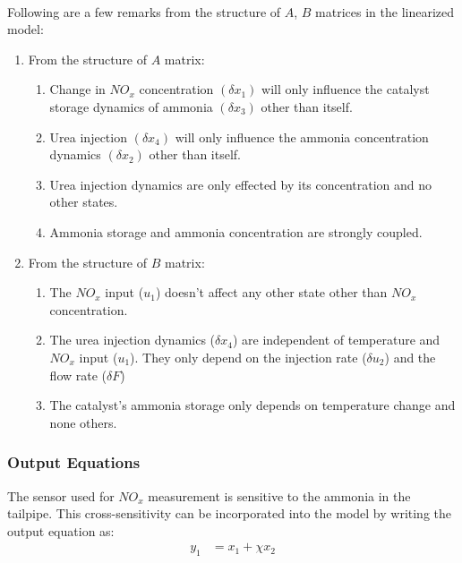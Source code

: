 \bigskip

\noindent{}\\

Following are a few remarks from the structure of $A$, $B$ matrices in the
linearized model:

\begin{enumerate}
    \item From the structure of $A$ matrix:
    \begin{enumerate}
\item Change in $NO_x$ concentration $(\delta x_1)$ will only influence the
catalyst storage dynamics of ammonia $(\delta x_3)$ other than itself.

\item Urea injection $(\delta x_4)$ will only influence the ammonia
concentration dynamics $(\delta x_2)$ other than itself.

\item Urea injection dynamics are only effected by its concentration and
no other states.

\item Ammonia storage and ammonia concentration are strongly coupled.
    \end{enumerate}
    \item From the structure of $B$ matrix:
    \begin{enumerate}
        \item The $NO_x$ input ($u_1$) doesn't affect any other state other than $NO_x$ concentration.

\item The urea injection dynamics ($\delta x_4$) are independent of temperature
and $NO_x$ input ($u_1$). They only depend on the injection rate ($\delta u_2$)
and the flow rate ($\delta F$)

\item The catalyst's ammonia storage only depends on temperature change and none others.
    \end{enumerate}
\end{enumerate}



\subsubsection{Output Equations}
The sensor used for $NO_x$ measurement is sensitive to the ammonia in the
tailpipe. This cross-sensitivity can be incorporated into the model by writing
the output equation as:
\begin{align*}
    y_1 &= x_1 + \chi x_2\\
\end{align*}

